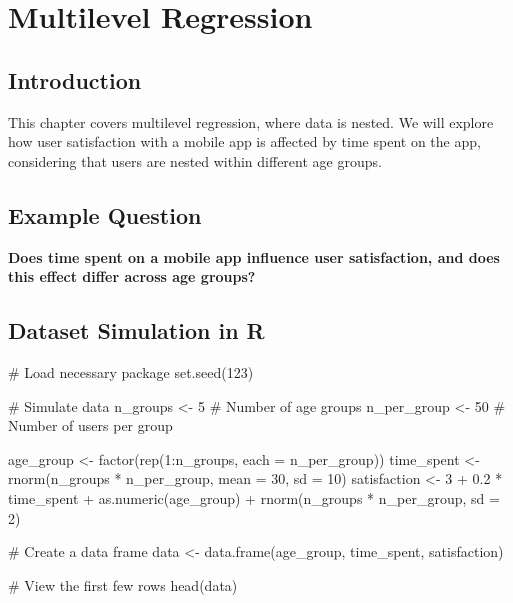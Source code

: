 \documentclass[
  letterpaper,
  DIV=11,
  numbers=noendperiod]{scrreprt}
\newenvironment{Shaded}{\begin{snugshade}}{\end{snugshade}}
\newcommand{\AttributeTok}[1]{\textcolor[rgb]{0.40,0.45,0.13}{#1}}
\newcommand{\CommentTok}[1]{\textcolor[rgb]{0.37,0.37,0.37}{#1}}
\newcommand{\DecValTok}[1]{\textcolor[rgb]{0.68,0.00,0.00}{#1}}
\newcommand{\FloatTok}[1]{\textcolor[rgb]{0.68,0.00,0.00}{#1}}
\newcommand{\FunctionTok}[1]{\textcolor[rgb]{0.28,0.35,0.67}{#1}}
\newcommand{\NormalTok}[1]{\textcolor[rgb]{0.00,0.23,0.31}{#1}}
\newcommand{\OtherTok}[1]{\textcolor[rgb]{0.00,0.23,0.31}{#1}}
\newcommand{\SpecialCharTok}[1]{\textcolor[rgb]{0.37,0.37,0.37}{#1}}
\begin{document}

\chapter{Multilevel Regression}\label{multilevel-regression}

\section{Introduction}\label{introduction-3}

This chapter covers multilevel regression, where data is nested. We will
explore how user satisfaction with a mobile app is affected by time
spent on the app, considering that users are nested within different age
groups.

\section{Example Question}\label{example-question-2}

\textbf{Does time spent on a mobile app influence user satisfaction, and
does this effect differ across age groups?}

\section{Dataset Simulation in R}\label{dataset-simulation-in-r-1}

\begin{Shaded}
\begin{Highlighting}[]
\CommentTok{\# Load necessary package}
\FunctionTok{set.seed}\NormalTok{(}\DecValTok{123}\NormalTok{)}

\CommentTok{\# Simulate data}
\NormalTok{n\_groups }\OtherTok{\textless{}{-}} \DecValTok{5}  \CommentTok{\# Number of age groups}
\NormalTok{n\_per\_group }\OtherTok{\textless{}{-}} \DecValTok{50}  \CommentTok{\# Number of users per group}

\NormalTok{age\_group }\OtherTok{\textless{}{-}} \FunctionTok{factor}\NormalTok{(}\FunctionTok{rep}\NormalTok{(}\DecValTok{1}\SpecialCharTok{:}\NormalTok{n\_groups, }\AttributeTok{each =}\NormalTok{ n\_per\_group))}
\NormalTok{time\_spent }\OtherTok{\textless{}{-}} \FunctionTok{rnorm}\NormalTok{(n\_groups }\SpecialCharTok{*}\NormalTok{ n\_per\_group, }\AttributeTok{mean =} \DecValTok{30}\NormalTok{, }\AttributeTok{sd =} \DecValTok{10}\NormalTok{)}
\NormalTok{satisfaction }\OtherTok{\textless{}{-}} \DecValTok{3} \SpecialCharTok{+} \FloatTok{0.2} \SpecialCharTok{*}\NormalTok{ time\_spent }\SpecialCharTok{+} \FunctionTok{as.numeric}\NormalTok{(age\_group) }\SpecialCharTok{+} \FunctionTok{rnorm}\NormalTok{(n\_groups }\SpecialCharTok{*}\NormalTok{ n\_per\_group, }\AttributeTok{sd =} \DecValTok{2}\NormalTok{)}

\CommentTok{\# Create a data frame}
\NormalTok{data }\OtherTok{\textless{}{-}} \FunctionTok{data.frame}\NormalTok{(age\_group, time\_spent, satisfaction)}

\CommentTok{\# View the first few rows}
\FunctionTok{head}\NormalTok{(data)}
\end{Highlighting}
\end{Shaded}
\end{document}
